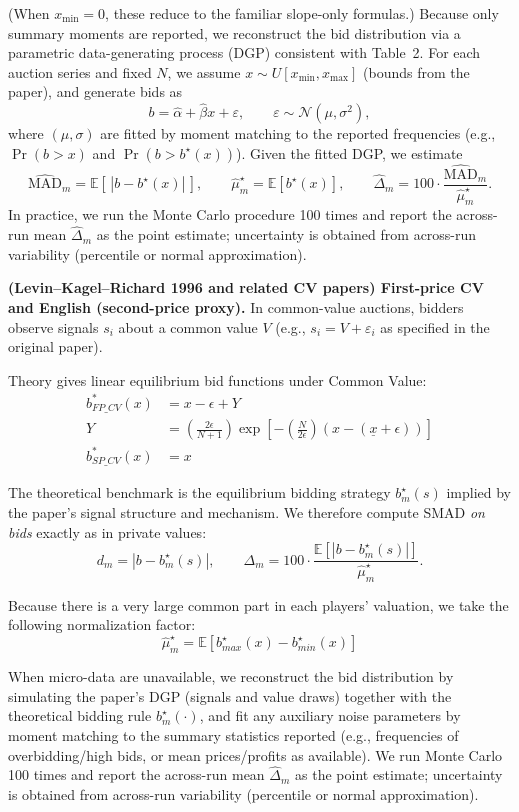 \documentclass[acmsmall,screen,review]{acmart}
\begin{document}
(When $x_{\min}=0$, these reduce to the familiar slope-only formulas.)
Because only summary moments are reported, we reconstruct the bid distribution via a parametric data-generating process (DGP) consistent with Table~2.
For each auction series and fixed $N$, we assume $x\sim U[x_{\min},x_{\max}]$ (bounds from the paper), and generate bids as
\[
b = \hat\alpha+\hat\beta x + \varepsilon,\qquad \varepsilon\sim \mathcal N(\mu,\sigma^2),
\]
where $(\mu,\sigma)$ are fitted by moment matching to the reported frequencies (e.g., $\Pr(b>x)$ and $\Pr(b>b^\star(x))$).
Given the fitted DGP, we estimate
\[
\widehat{\mathrm{MAD}}_m = \mathbb E\!\left[\,|b-b^\star(x)|\,\right],
\qquad
\widehat{\mu}_m^\star=\mathbb E[b^\star(x)],
\qquad
\widehat{\Delta}_m = 100\cdot \frac{\widehat{\mathrm{MAD}}_m}{\widehat{\mu}_m^\star}.
\]
In practice, we run the Monte Carlo procedure 100 times and report the across-run mean $\widehat{\Delta}_m$ as the point estimate; uncertainty is obtained from across-run variability (percentile or normal approximation).


\textbf{(Levin--Kagel--Richard 1996 and related CV papers) First-price CV and English (second-price proxy).}
In common-value auctions, bidders observe signals $s_i$ about a common value $V$ (e.g., $s_i=V+\varepsilon_i$ as specified in the original paper).

Theory gives linear equilibrium bid functions under Common Value:
$$\begin{aligned}
b^*_{FP\_CV}(x) &= x - \epsilon + Y\\
Y &= \left( \frac{2\epsilon}{N+1} \right) \exp\left[ -\left( \frac{N}{2\epsilon} \right) (x - (\underline{x} + \epsilon)) \right]\\
b^*_{SP\_CV}(x) &= x
\end{aligned}$$

The theoretical benchmark is the equilibrium bidding strategy $b_m^\star(s)$ implied by the paper's signal structure and mechanism. We therefore compute SMAD \emph{on bids} exactly as in private values:
\[
d_m = |b - b_m^\star(s)|,
\qquad
\Delta_m = 100\cdot \frac{\mathbb E[|b-b_m^\star(s)|]}{\widehat{\mu}_m^\star}.
\]

Because there is a very large common part in each players' valuation, we take the following normalization factor:
\[
{\widehat{\mu}_m^\star} = \mathbb E[b^\star_{max}(x) - b^\star_{min}(x)]
\]

When micro-data are unavailable, we reconstruct the bid distribution by simulating the paper's DGP (signals and value draws) together with the theoretical bidding rule $b_m^\star(\cdot)$, and fit any auxiliary noise parameters by moment matching to the summary statistics reported (e.g., frequencies of overbidding/high bids, or mean prices/profits as available). We run Monte Carlo 100 times and report the across-run mean $\widehat{\Delta}_m$ as the point estimate; uncertainty is obtained from across-run variability (percentile or normal approximation).
\end{document}
